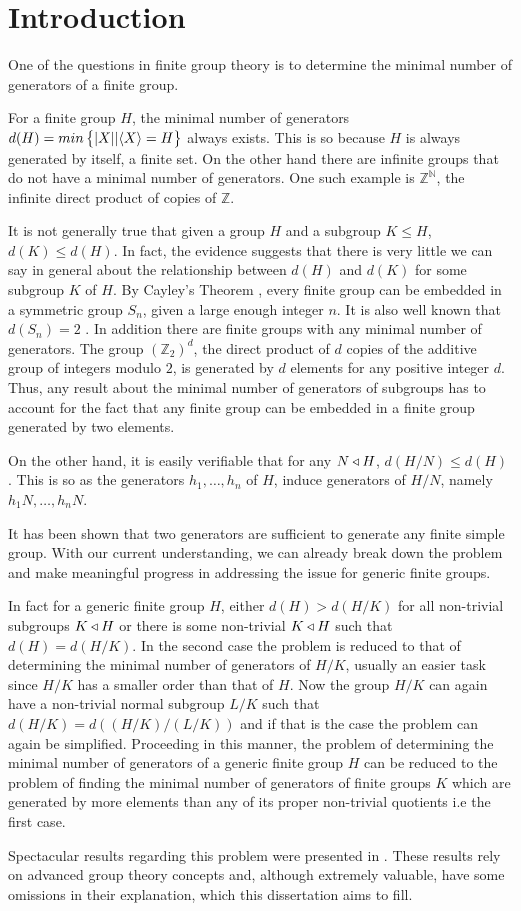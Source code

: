 \chapter*{Introduction}
One of the questions in finite group theory is to determine the minimal number of generators of a finite group.

For a finite group $H$, the minimal number of generators $d(H) = min\left\{| X ||\langle X \rangle = H \right\}$ always exists. This is so because $H$ is always generated by itself, a finite set. On the other hand there are infinite groups that do not have a minimal number of generators. One such example is $\mathbb{Z}^{\mathbb{N}}$, the infinite direct product of copies of $\mathbb{Z}$.

It is not generally true that given a group $H$ and a subgroup $K \le H$, $d(K) \le d(H)$. 
In fact, the evidence suggests that there is very little we can say in general about the relationship between $d(H)$ and $d(K)$ for some subgroup $K$ of $H$. By Cayley's Theorem \cite[Theorem 3.12]{RotmanITG}, every finite group can be embedded in a symmetric group $S_n$, given a large enough integer $n$. It is also well known that $d(S_n) = 2$ \cite[Exercise 2.9 (iii)]{RotmanITG}. In addition there are finite groups with any minimal number of generators. The group $(\mathbb{Z}_2)^d$, the direct product of $d$ copies of the additive group of integers modulo $2$, is generated by $d$ elements for any positive integer $d$. Thus, any result about the minimal number of generators of subgroups has to account for the fact that any finite group can be embedded in a finite group generated by two elements.

On the other hand, it is easily verifiable that for any $N \triangleleft H$, $d(H/N) \le d(H)$. 
This is so as the generators $h_1,\ldots,h_n$ of $H$, induce generators of $H/N$, namely $h_1N, \ldots , h_nN$.


It has been shown \cite{AschbacherSAFCG} that two generators are sufficient to generate any finite simple group.
With our current understanding, we can already break down the problem and make meaningful progress in addressing the issue for generic finite groups.

In fact for a generic finite group $H$, either $d(H) > d(H/K)$ for all non-trivial subgroups $K \triangleleft H$ or there is some non-trivial $K \triangleleft H$ such that $d(H) = d(H/K)$. In the second case the problem is reduced to that of determining the minimal number of generators of $H/K$, usually an easier task since $H/K$ has a smaller order than that of $H$. Now the group $H/K$ can again have a non-trivial normal subgroup $L/K$ such that $d(H/K) = d((H/K)/(L/K))$ and if that is the case the problem can again be simplified. Proceeding in this manner, the problem of determining the minimal number of generators of a generic finite group $H$ can be reduced to the problem of finding the minimal number of generators of finite groups $K$ which are generated by more elements than any of its proper non-trivial quotients i.e the first case.

Spectacular results regarding this problem were presented in \cite{DallaVoltaFGNMGAPQ}. These results rely on advanced group theory concepts and, although extremely valuable, have some omissions in their explanation, which this dissertation aims to fill.
